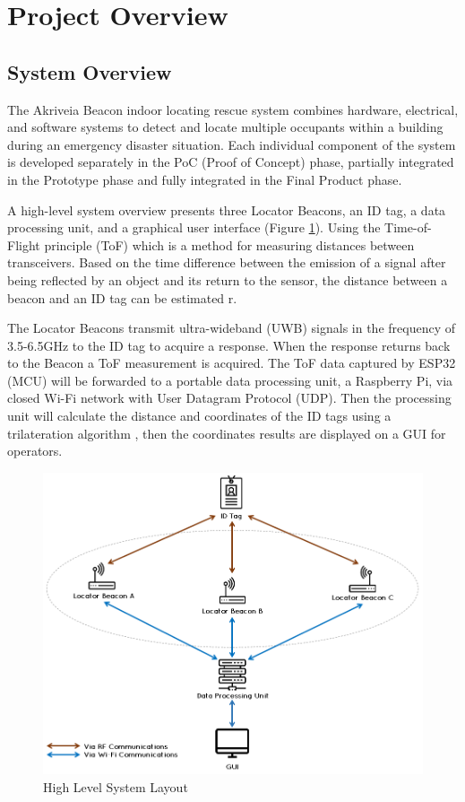 

\setcounter{section}{1}
\section{Project Overview}
\bigskip
\subsection{System Overview}
\medskip
The Akriveia Beacon indoor locating rescue system combines hardware, electrical, and software systems to detect and locate multiple occupants within a building during an emergency disaster situation. Each individual component of the system is developed separately in the PoC (Proof of Concept) phase, partially integrated in the Prototype phase and fully integrated in the Final Product phase. 

\bigskip
A high-level system overview presents three Locator Beacons, an ID tag, a data processing unit, and a graphical user interface (Figure \ref{sys_arch}). Using the Time-of-Flight principle (ToF) which is a method for measuring distances between transceivers. Based on the time difference between the emission of a signal after being reflected by an object and its return to the sensor, the distance between a beacon and an ID tag can be estimated r\cite{R2-0}. 

\bigskip
The Locator Beacons transmit ultra-wideband (UWB) signals in the frequency of 3.5-6.5GHz to the ID tag to acquire a response. When the response returns back to the Beacon a ToF measurement is acquired. The ToF data captured by ESP32 (MCU) will be forwarded to a portable data processing unit, a Raspberry Pi, via closed Wi-Fi network with User Datagram Protocol (UDP). Then the processing unit will calculate the distance and coordinates of the ID tags using a trilateration algorithm , then the coordinates results are displayed on a GUI for operators.


\medskip
\begin{figure}[H]
\centering
    \includegraphics[scale=0.60]{./images/00_sys_arch.png}
    \caption{High Level System Layout}
    \label{sys_arch}
\end{figure}
\pagebreak

